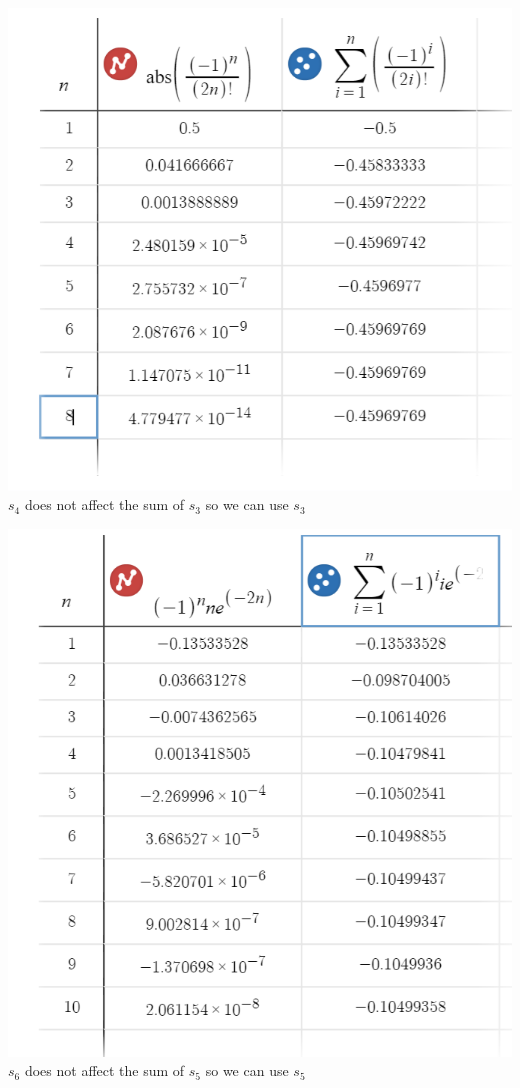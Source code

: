 \documentclass[12pt]{article}
\begin{document}
\includegraphics[width=\linewidth]{11_5_27}
$s_4$ does not affect the sum of $s_3$ so we can use $s_3$

\includegraphics[width=\linewidth]{11_5_29}
$s_6$ does not affect the sum of $s_5$ so we can use $s_5$
\end{document}
